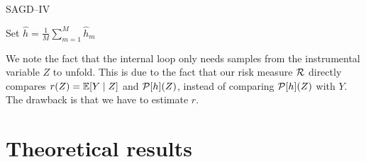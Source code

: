 \begin{algorithm}[H]\label{algo: sagdiv}
    \caption{SAGD--IV}
Set $ \hat{ h } = \frac{ 1 }{ M } \sum_{ m=1 }^{ M } \hat{ h }_{ m } $ \;
\end{algorithm}
We note the fact that the internal loop only needs samples from the instrumental variable $ Z $ to unfold.
This is due to the fact that our risk measure $ \mathcal{R} $ directly compares $ r ( Z ) = \mathbb{E} [ Y \mid Z ] $ and $ \mathcal{P} [ h ] ( Z ) $, instead of comparing $ \mathcal{P} [ h ] ( Z ) $ with $ Y $.
The drawback is that we have to estimate $ r $.

\section{Theoretical results}

